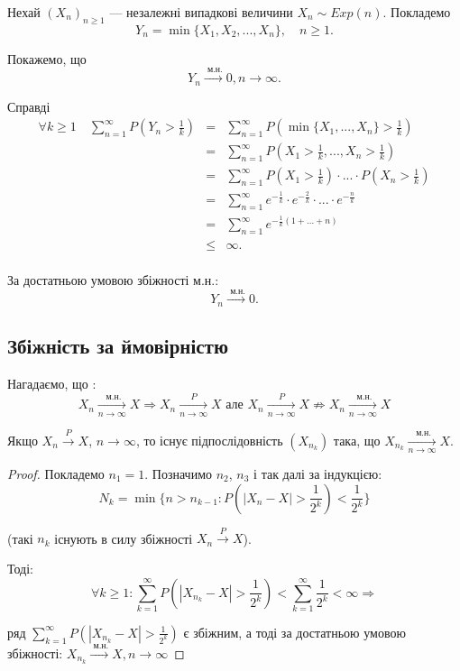 \begin{example}
    Нехай $(X_n)_{n \geqslant 1}$ --- незалежні випадкові величини
    $X_n \sim Exp(n)$. Покладемо
    $$Y_n = \min\{X_1, X_2, ..., X_n\}, \quad n \geqslant 1.$$
    
    Покажемо, що
    $$Y_n \xrightarrow{\text{ м.н.}} 0, n \rightarrow \infty.$$
    
    Справді
    $$\begin{array}{rcl}
        \forall k \geqslant 1 \quad \sum\limits_{n = 1}^{\infty} P(Y_n > \frac{1}{k}) & = & 
            \sum\limits_{n=1}^{\infty} P(\min\{X_1, ..., X_n\} > \frac{1}{k}) \\
        & = & \sum\limits_{n=1}^{\infty} P(X_1 > \frac{1}{k}, ..., X_n > \frac{1}{k}) \\
        & = & \sum\limits_{n=1}^{\infty} P(X_1 > \frac{1}{k}) \cdot ... \cdot P(X_n > \frac{1}{k}) \\
        & = & \sum\limits_{n=1}^{\infty} e^{-\frac{1}{k}} \cdot e^{-\frac{2}{k}} \cdot ... \cdot e^{-\frac{n}{k}} \\
        & = & \sum\limits_{n=1}^{\infty} e^{-\frac{1}{k}(1 + ... + n)}\\
        & \leqslant & \infty. \\
    \end{array}$$

    За достатньою умовою збіжності м.н.:
    $$Y_n \xrightarrow{\text{ м.н.}} 0.$$
\end{example}

    
\subsection{Збіжність за ймовірністю}

Нагадаємо, що :
$$X_n \xrightarrow[n \rightarrow \infty]{\text{ м.н.}} X \Rightarrow
X_n \xrightarrow[n \rightarrow \infty]{P} X \text{ але }
X_n \xrightarrow[n \rightarrow \infty]{P} X \not\Rightarrow
X_n \xrightarrow[n \rightarrow \infty]{\text{ м.н.}} X$$

\begin{lemma}
    Якщо $X_n \xrightarrow{P} X$, $n \rightarrow \infty$, то існує
    підпослідовність $(X_{n_k})$ така, що 
    $X_{n_k} \xrightarrow[n \rightarrow \infty]{\text{ м.н.}} X$.
\end{lemma}
\begin{proof}
    Покладемо $n_1 = 1$. Позначимо $n_2$, $n_3$ і так далі  за індукцією:
    $$N_k = \min\{n > n_{k-1}: P(|X_n - X| > \frac{1}{2^k}) < \frac{1}{2^k}\}$$
    
    (такі $n_k$ існують в силу збіжності $X_n \xrightarrow{P} X$).
    
    Тоді:
    $$\forall k \geqslant 1:
    \sum\limits_{k=1}^{\infty} P(|X_{n_k} - X| > \frac{1}{2^k})
    < \sum\limits_{k=1}^{\infty} \frac{1}{2^k}
    < \infty \Rightarrow$$
    
    ряд $\sum\limits_{k=1}^{\infty} P(|X_{n_k} - X| > \frac{1}{2^k})$
    є збіжним, а тоді за достатньою умовою збіжності:
    $X_{n_k} \xrightarrow{\text{ м.н.}} X, n \rightarrow \infty$
\end{proof}


